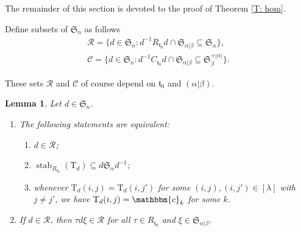 \documentclass[pdftex]{sigma}
\newtheorem{Lemma}[Theorem]{Lemma}
\renewcommand{\t}{\mathfrak{t}}
\newcommand{\T}{\mathrm{T}}
\newcommand{\stab}{\operatorname{stab}}
\newcommand{\sym}[1]{\mathfrak{S}_{#1}}
\newcommand{\bb}[1]{\mathbbm{{#1}}}
\newcommand{\R}{\mathscr{R}}
\newcommand{\C}{\mathscr{C}}
\newcommand{\tlsym}[2]{\mathfrak{S}_{#1}^{+#2}}
\begin{document}
The remainder of this section is devoted to the proof of Theorem \ref{T: hom}.

\begin{Definition}\label{D:RC}
Define subsets of $\sym{n}$ as follows
\begin{gather*}
\R = \big\{ d \in \sym{n}\colon d^{-1} R_{\t_0}d \cap \sym{\alpha|\beta} \subseteq \sym{\alpha} \big\}, \\
\C = \big\{ d \in \sym{n}\colon d^{-1} C_{\t_0}d \cap \sym{\alpha|\beta} \subseteq \tlsym{\beta}{|\alpha|} \big\}.
\end{gather*}
\end{Definition}

These sets $\R$ and $\C$ of course depend on $\t_0$ and $(\alpha|\beta)$.

\begin{Lemma} \label{L:R}
Let $d \in \sym{n}$.
\begin{enumerate}\itemsep=0pt
\item[$(i)$] The following statements are equivalent:
\begin{enumerate}\itemsep=0pt
\item [$(a)$] $d \in \R$;
\item [$(b)$] $\stab_{R_{\t_0}} (\T_d) \subseteq d\sym{\alpha}d^{-1}$;
\item [$(c)$] whenever $\T_d(i,j) = \T_d(i,j')$ for some $(i,j),(i,j') \in [\lambda]$ with $j \ne j'$, we have $\T_d(i,j) = \bb{c}_k$ for some $k$.
\end{enumerate}
\item[$(ii)$] If $d \in \R$, then $\tau d \xi \in \R$ for all $\tau \in R_{\t_0}$ and $\xi \in \sym{\alpha|\beta}$.
\end{enumerate}
\end{Lemma}
\end{document}
